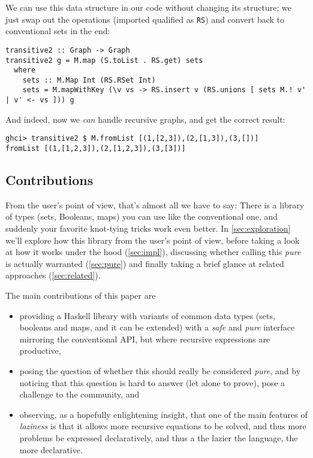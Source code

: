 \documentclass[manuscript,screen,acmsmall]{acmart}
\begin{document}
We can use this data structure in our code without changing its structure; we just swap out the operations (imported qualified as \verb|RS|) and convert back to conventional sets in the end:
\begin{verbatim}
transitive2 :: Graph -> Graph
transitive2 g = M.map (S.toList . RS.get) sets
  where
    sets :: M.Map Int (RS.RSet Int)
    sets = M.mapWithKey (\v vs -> RS.insert v (RS.unions [ sets M.! v' | v' <- vs ])) g
\end{verbatim}

And indeed, now we \emph{can} handle recursive graphs, and get the correct result:
\begin{verbatim}
ghci> transitive2 $ M.fromList [(1,[2,3]),(2,[1,3]),(3,[])]
fromList [(1,[1,2,3]),(2,[1,2,3]),(3,[3])]
\end{verbatim}

\subsection{Contributions}

From the user’s point of view, that’s almost all we have to say: There is a library of types (sets, Booleans, maps) you can use like the conventional one, and suddenly your favorite knot-tying tricks work even better. In \cref{sec:exploration} we'll explore how this library from the user's point of view, before taking a look at how it works under the hood (\cref{sec:impl}), discussing whether calling this \emph{pure} is actually warranted (\cref{sec:pure}) and finally taking a brief glance at related approaches (\cref{sec:related}).

The main contributions of this paper are
\begin{itemize}
\item providing a Haskell library with variants of common data types (sets, booleans and maps, and it can be extended) with a \emph{safe} and \emph{pure} interface mirroring the conventional API, but where recursive expressions are productive,
\item posing the question of whether this should really be considered \emph{pure}, and by noticing that this question is hard to answer (let alone to prove), pose a challenge to the community, and
\item observing, as a hopefully enlightening insight, that one of the main features of \emph{laziness} is that it allows more recursive equations to be solved, and thus more problems be expressed declaratively, and thus a the lazier the language, the more declarative.
\end{itemize}
\end{document}
